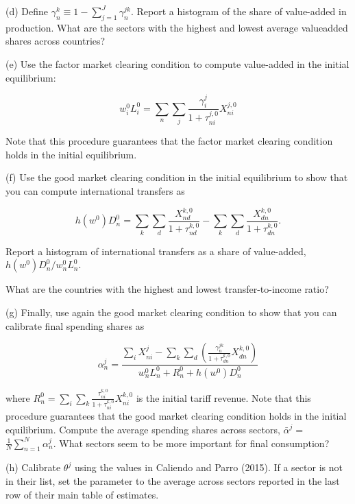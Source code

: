 \documentclass[12pt,oneside,reqno]{article}
\begin{document}
\begin{enumerate}
(d) Define $\gamma_{n}^{k} \equiv 1-\sum_{j=1}^{J} \gamma_{n}^{j k}$. Report a histogram of the share of value-added in production. What are the sectors with the highest and lowest average valueadded shares across countries?

(e) Use the factor market clearing condition to compute value-added in the initial equilibrium:

\begin{equation*}
w_{i}^{0} L_{i}^{0}=\sum_{n} \sum_{j} \frac{\gamma_{i}^{j}}{1+\tau_{n i}^{j, 0}} X_{n i}^{j, 0}
\end{equation*}

Note that this procedure guarantees that the factor market clearing condition holds in the initial equilibrium.

(f) Use the good market clearing condition in the initial equilibrium to show that you can compute international transfers as

\begin{equation*}
h\left(w^{0}\right) D_{n}^{0}=\sum_{k} \sum_{d} \frac{X_{n d}^{k, 0}}{1+\tau_{n d}^{k, 0}}-\sum_{k} \sum_{d} \frac{X_{d n}^{k, 0}}{1+\tau_{d n}^{k, 0}} .
\end{equation*}

Report a histogram of international transfers as a share of value-added, $h\left(w^{0}\right) D_{n}^{0} / w_{n}^{0} L_{n}^{0}$.

What are the countries with the highest and lowest transfer-to-income ratio?

(g) Finally, use again the good market clearing condition to show that you can calibrate final spending shares as

\begin{equation*}
\alpha_{n}^{j}=\frac{\sum_{i} X_{n i}^{j}-\sum_{k} \sum_{d}\left(\frac{\gamma_{n}^{j k}}{1+\tau_{d n}^{k, 0}} X_{d n}^{k, 0}\right)}{w_{n}^{0} L_{n}^{0}+R_{n}^{0}+h\left(w^{0}\right) D_{n}^{0}}
\end{equation*}

where $R_{n}^{0}=\sum_{i} \sum_{k} \frac{\tau_{n i}^{k, 0}}{1+\tau_{n i}^{k, 0}} X_{n i}^{k, 0}$ is the initial tariff revenue. Note that this procedure guarantees that the good market clearing condition holds in the initial equilibrium. Compute the average spending shares across sectors, $\bar{\alpha}^{j}=$ $\frac{1}{N} \sum_{n=1}^{N} \alpha_{n}^{j}$. What sectors seem to be more important for final consumption?

(h) Calibrate $\theta^{j}$ using the values in Caliendo and Parro (2015). If a sector is not in their list, set the parameter to the average across sectors reported in the last row of their main table of estimates.


\end{enumerate}
\end{document}
